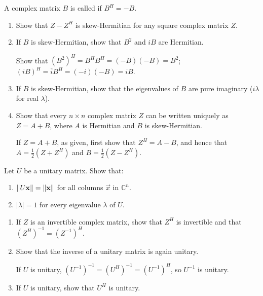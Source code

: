 \documentclass{ximera}
\begin{document}
\begin{problem}\label{prb:complex_matrices14}
A complex matrix $B$ is called  if $B^{H} = -B$.

\begin{enumerate}[label={\alph*.}]
\item Show that $Z - Z^{H}$ is skew-Hermitian for any square complex matrix $Z$.

\item If $B$ is skew-Hermitian, show that $B^{2}$ and $iB$ are Hermitian.
\begin{hint}
Show that $(B^2)^H = B^HB^H = (-B)(-B) = B^2$; $(iB)^H = \overline{i}B^H = (-i)(-B) = iB$.
\end{hint}

\item If $B$ is skew-Hermitian, show that the eigenvalues of $B$ are pure imaginary ($i \lambda$ for real $\lambda$).

\item Show that every $n \times n$ complex matrix $Z$ can be written uniquely as $Z = A + B$, where $A$ is Hermitian and $B$ is skew-Hermitian.
\begin{hint}
If $Z = A + B$, as given, first show that $Z^{H} = A - B$, and hence that $A = \frac{1}{2}(Z + Z^{H})$ and $B = \frac{1}{2}(Z - Z^{H})$.
\end{hint}
\end{enumerate}
\end{problem}

\begin{problem}\label{prb:complex_matrices15}
Let $U$ be a unitary matrix. Show that:

\begin{enumerate}
\item $\left\lVert U\mathbf{x} \right\rVert = \left\lVert \mathbf{x} \right\rVert$ for all columns $\vec{x}$ in $\mathbb{C}^n$.

\item $|\lambda| = 1$ for every eigenvalue $\lambda$ of $U$.

\end{enumerate}
\end{problem}


\begin{problem}\label{prb:complex_matrices16}
\begin{enumerate}
\item If $Z$ is an invertible complex matrix, show that $Z^{H}$ is invertible and that $(Z^{H})^{-1} = (Z^{-1})^{H}$.

\item Show that the inverse of a unitary matrix is again unitary.
\begin{hint}
If $U$ is unitary, $(U^{-1})^{-1} = (U^{H})^{-1} = (U^{-1})^{H}$, so $U^{-1}$ is unitary.
\end{hint}

\item If $U$ is unitary, show that $U^{H}$ is unitary.

\end{enumerate}
\end{problem}
\end{document}
